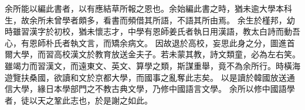 余所能以編此書者，以有應結草所報之恩也。余始編此書之時，猶未逾大學本科生，故余所未曾學者頗多，看書而頻借其所語，不語其所由焉。
余生於槿邦，幼時雖習漢字於初校，猶未懷志才，中學有恩師姜氏者執日用漢語，教太白詩而動吾心，有恩師朴氏者執文言，而矯余病文。
因故退於高校，妄思此身之分，圖進首爾大學，而習高校漢文於教育放送金夫子。若未蒙其教，詩文類童，必為左右笑。
雖竭力而習漢文，而遠東文、英文、算學之類，斯謀重舉，竟不為余所行。時橫海遊覽扶桑國，欲讀和文於京都大學，而國事之亂奪此志矣。
以是讀於韓國放送通信大學，緣日本學部門之不教古典文學，乃修中國語言文學。
余所以修中國語學者，徒以天之鞏此志也，於是謝之如此。